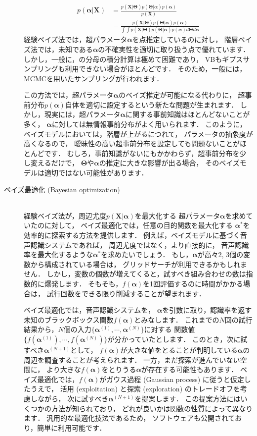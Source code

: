 \begin{description}
\begin{align}
 p(\bm\alpha|\bm{X}) 
 &= \frac{p(\bm{X}|\bm\Theta)p(\bm\Theta|\bm\alpha)p(\bm\alpha)}{p(\bm{X})}
 \nonumber\\
 &= \frac{p(\bm{X}|\bm\Theta)p(\bm\Theta|\bm\alpha)p(\bm\alpha)}
 {\int\int p(\bm{X}|\bm\Theta)p(\bm\Theta|\bm\alpha)p(\bm\alpha) d\bm\Theta d\bm\alpha}
\label{eq:hb_posterior}
\end{align}
経験ベイズ法では，超パラメータ$\bm\alpha$を点推定しているのに対し，
階層ベイズ法では，未知である$\bm\alpha$の不確実性を適切に取り扱う点で優れています．
しかし，一般に，の分母の積分計算は極めて困難であり，
VBもギブスサンプリングも利用できない場合がほとんどです．
そのため，一般には，MCMCを用いたサンプリングが行われます．

この方法では，超パラメータ$\bm\alpha$のベイズ推定が可能になる代わりに，
超事前分布$p(\bm\alpha)$自体を適切に設定するという新たな問題が生まれます．
しかし，現実には，超パラメータ$\bm\alpha$に関する事前知識はほとんどないことが多く，
$\bm\alpha$に対しては無情報事前分布がよく用いられます．
このように，ベイズモデルにおいては，階層が上がるにつれて，
パラメータの抽象度が高くなるので，
曖昧性の高い超事前分布を設定しても問題ないことがほとんどです．
むしろ，事前知識がないにもかかわらず，超事前分布を少し変えるだけで，
$\bm\Theta$や$\bm\alpha$の推定に大きな影響が出る場合，
そのベイズモデルは適切ではない可能性があります．
\item[ベイズ最適化 (Bayesian optimization)] \ \\
経験ベイズ法が，周辺尤度$p(\bm{X}|\bm\alpha)$を最大化する
超パラメータ$\bm\alpha$を求めていたのに対して，
ベイズ最適化では，任意の目的関数を最大化する
$\bm\alpha^*$を効率的に探索する方法を提供します．
例えば，ベイズモデルに基づく音声認識システムであれば，
周辺尤度ではなく，より直接的に，
音声認識率を最大化するような$\bm\alpha^*$を求めたいでしょう．
もし，$\bm\alpha$が高々2, 3個の変数から構成されている場合は，
グリッドサーチが利用できるかもしれません．
しかし，変数の個数が増えてくると，試すべき組み合わせの数は指数的に爆発します．
そもそも，$f(\bm\alpha)$を1回評価するのに時間がかかる場合は，
試行回数をできる限り削減することが望まれます．

ベイズ最適化では，音声認識システムを，
$\bm\alpha$を引数に取り，認識率を返す未知のブラックボックス関数$f(\bm\alpha)$とみなします．
これまでの$N$回の試行結果から，$N$個の入力$\{\bm\alpha^{(1)},\cdots,\bm\alpha^{(N)}\}$に対する
関数値$\{f(\bm\alpha^{(1)}),\cdots,f(\bm\alpha^{(N)})\}$が分かっていたとします．
このとき，次に試すべき$\bm\alpha^{(N+1)}$として，
$f(\bm\alpha)$が大きな値をとることが判明している$\bm\alpha$の周辺を調査することが考えられます．
一方，まだ探索が進んでいない空間に，
より大きな$f(\bm\alpha)$をとりうる$\bm\alpha$が存在する可能性もあります．
ベイズ最適化では，$f(\bm\alpha)$がガウス過程 (Gaussian process) に従うと仮定したうえで，
活用 (exploitation) と探索 (exploration) のトレードオフを考慮しながら，
次に試すべき$\bm\alpha^{(N+1)}$を提案します．
この提案方法にはいくつかの方法が知られており\cite{a,b,c,d}，
どれが良いかは関数の性質によって異なります．
汎用的な最適化技法であるため，
ソフトウェアも公開されており，簡単に利用可能です\cite{soft}．
\end{description}

